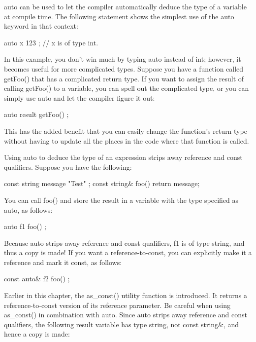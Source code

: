 auto can be used to let the compiler automatically deduce the type of a variable at compile time. The following statement shows the simplest use of the auto keyword in that context:

\begin{cpp}
auto x { 123 }; // x is of type int.
\end{cpp}

In this example, you don’t win much by typing auto instead of int; however, it becomes useful for more complicated types. Suppose you have a function called getFoo() that has a complicated return type. If you want to assign the result of calling getFoo() to a variable, you can spell out the complicated type, or you can simply use auto and let the compiler figure it out:

\begin{cpp}
auto result { getFoo() };
\end{cpp}

This has the added benefit that you can easily change the function’s return type without having to update all the places in the code where that function is called.


Using auto to deduce the type of an expression strips away reference and const qualifiers. Suppose you have the following:

\begin{cpp}
const string message { "Test" };
const string& foo() { return message; }
\end{cpp}

You can call foo() and store the result in a variable with the type specified as auto, as follows:

\begin{cpp}
auto f1 { foo() };
\end{cpp}

Because auto strips away reference and const qualifiers, f1 is of type string, and thus a copy is made! If you want a reference-to-const, you can explicitly make it a reference and mark it const, as follows:

\begin{cpp}
const auto& f2 { foo() };
\end{cpp}

Earlier in this chapter, the as\_const() utility function is introduced. It returns a reference-to-const version of its reference parameter. Be careful when using as\_const() in combination with auto. Since auto strips away reference and const qualifiers, the following result variable has type string, not const string\&, and hence a copy is made:


